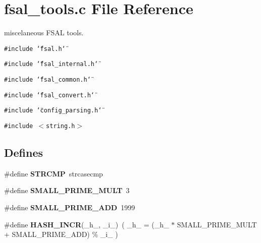 \section{fsal\_\-tools.c File Reference}
\label{fsal__tools_8c}
miscelaneous FSAL tools.  


{\tt \#include \char`\"{}fsal.h\char`\"{}}\par
{\tt \#include \char`\"{}fsal\_\-internal.h\char`\"{}}\par
{\tt \#include \char`\"{}fsal\_\-common.h\char`\"{}}\par
{\tt \#include \char`\"{}fsal\_\-convert.h\char`\"{}}\par
{\tt \#include \char`\"{}config\_\-parsing.h\char`\"{}}\par
{\tt \#include $<$string.h$>$}\par
\subsection*{Defines}
\begin{CompactItemize}
\item 
\#define \textbf{STRCMP}~strcasecmp\label{fsal__tools_8c_1ffef5879101d778f17a377e0d8b0e00}

\item 
\#define \textbf{SMALL\_\-PRIME\_\-MULT}~3\label{fsal__tools_8c_95706123588ac755c4ed3b5d78dcd72b}

\item 
\#define \textbf{SMALL\_\-PRIME\_\-ADD}~1999\label{fsal__tools_8c_8b2eea7185994e4333b75f02231a8d7b}

\item 
\#define \textbf{HASH\_\-INCR}(\_\-h\_\-, \_\-i\_\-)~( \_\-h\_\- = (\_\-h\_\- $\ast$ SMALL\_\-PRIME\_\-MULT + SMALL\_\-PRIME\_\-ADD) \% \_\-i\_\- )\label{fsal__tools_8c_3e856864aba497e6b22de127c7b7ad2b}

\end{CompactItemize}
